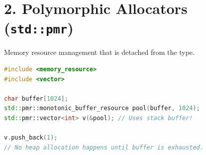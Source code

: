 \hypertarget{polymorphic-allocators-stdpmr}{%
\section{\texorpdfstring{2. Polymorphic Allocators
(\texttt{std::pmr})}{2. Polymorphic Allocators (std::pmr)}}\label{polymorphic-allocators-stdpmr}}

Memory resource management that is detached from the type.

\begin{lstlisting}[language={C++}]
#include <memory_resource>
#include <vector>

char buffer[1024];
std::pmr::monotonic_buffer_resource pool(buffer, 1024);
std::pmr::vector<int> v(&pool); // Uses stack buffer!

v.push_back(1); 
// No heap allocation happens until buffer is exhausted.
\end{lstlisting}
